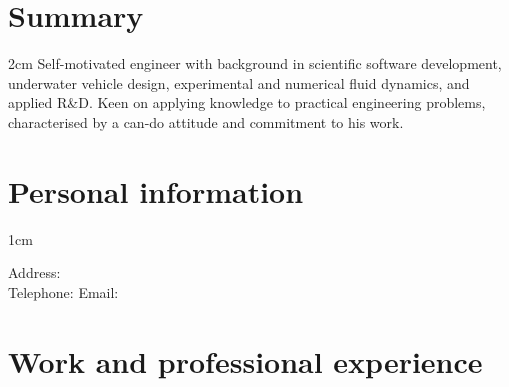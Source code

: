 \documentclass[a4paper,10pt]{article}
\begin{document}
\pagestyle{empty} %

\par{\par\par}

\section{Summary}

\hspace{1cm}
\begin{minipage}{\textwidth}
\begin{adjustwidth}{}{2cm} %
	Self-motivated engineer with background in scientific
		software development, underwater vehicle design, experimental
		and numerical fluid dynamics, and applied R\&D.
	Keen on applying knowledge to practical engineering problems,
		characterised by a can-do attitude and commitment to his work.
\end{adjustwidth}
\end{minipage}

\section{Personal information}

\begin{minipage}{\textwidth}
\begin{adjustwidth}{}{1cm} %

%

Address: \\
Telephone: \hspace{2cm} Email:

\end{adjustwidth}
\end{minipage}


\section{Work and professional experience}
\end{document}
